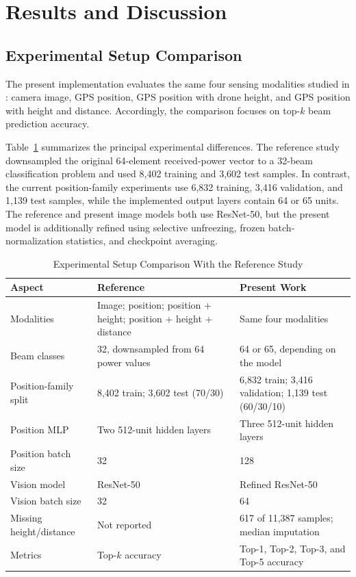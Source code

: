 \section{Results and Discussion}
\label{sec:results}

\subsection{Experimental Setup Comparison}

The present implementation evaluates the same four sensing modalities studied
in \cite{charan2022drone}: camera image, GPS position, GPS position with drone
height, and GPS position with height and distance. Accordingly, the comparison
focuses on top-$k$ beam prediction accuracy.

Table~\ref{tab:setup_comparison} summarizes the principal experimental
differences. The reference study downsampled the original 64-element
received-power vector to a 32-beam classification problem and used 8,402
training and 3,602 test samples. In contrast, the current position-family
experiments use 6,832 training, 3,416 validation, and 1,139 test samples,
while the implemented output layers contain 64 or 65 units. The reference and
present image models both use ResNet-50, but the present model is additionally
refined using selective unfreezing, frozen batch-normalization statistics, and
checkpoint averaging.

\begin{table}[!t]
\caption{Experimental Setup Comparison With the Reference Study}
\label{tab:setup_comparison}
\centering
\scriptsize
\setlength{\tabcolsep}{2pt}
\renewcommand{\arraystretch}{1.10}
\begin{tabular}{p{}p{}p{}}
\hline
\textbf{Aspect} & \textbf{Reference \cite{charan2022drone}} &
\textbf{Present Work} \\
\hline
Modalities & Image; position; position + height; position + height + distance
& Same four modalities \\
Beam classes & 32, downsampled from 64 power values & 64 or 65, depending on
the model \\
Position-family split & 8,402 train; 3,602 test (70/30) & 6,832 train; 3,416
validation; 1,139 test (60/30/10) \\
Position MLP & Two 512-unit hidden layers & Three 512-unit hidden layers \\
Position batch size & 32 & 128 \\
Vision model & ResNet-50 & Refined ResNet-50 \\
Vision batch size & 32 & 64 \\
Missing height/distance & Not reported & 617 of 11,387 samples; median
imputation \\
Metrics & Top-$k$ accuracy & Top-1, Top-2, Top-3, and Top-5 accuracy \\
\hline
\end{tabular}
\end{table}

